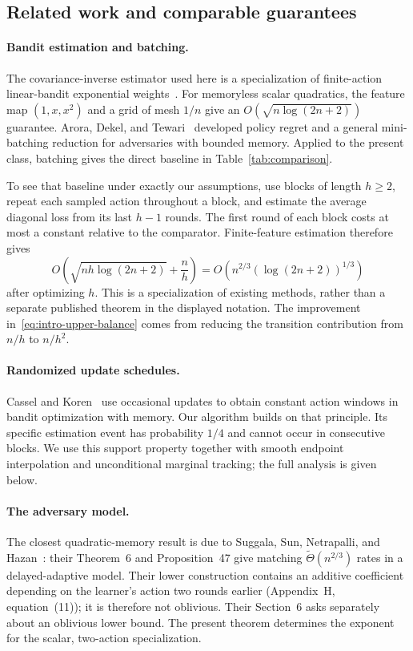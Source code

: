 \documentclass[11pt]{article}
\theoremstyle{definition}
\begin{document}
\subsection{Related work and comparable guarantees}\label{sec:related}

\paragraph{Bandit estimation and batching.}
The covariance-inverse estimator used here is a specialization of finite-action linear-bandit exponential weights~\cite{bubeck}. For memoryless scalar quadratics, the feature map $(1,x,x^2)$ and a grid of mesh $1/n$ give an $O(\sqrt{n\log(2n+2)})$ guarantee. Arora, Dekel, and Tewari~\cite{arora} developed policy regret and a general mini-batching reduction for adversaries with bounded memory. Applied to the present class, batching gives the direct baseline in Table~\ref{tab:comparison}.

To see that baseline under exactly our assumptions, use blocks of length $h\geq2$, repeat each sampled action throughout a block, and estimate the average diagonal loss from its last $h-1$ rounds. The first round of each block costs at most a constant relative to the comparator. Finite-feature estimation therefore gives
\begin{equation}\label{eq:batching-baseline}
 O\!\left(\sqrt{nh\log(2n+2)}+\frac{n}{h}\right)
 =O\!\left(n^{2/3}(\log(2n+2))^{1/3}\right)
\end{equation}
after optimizing $h$. This is a specialization of existing methods, rather than a separate published theorem in the displayed notation. The improvement in~\eqref{eq:intro-upper-balance} comes from reducing the transition contribution from $n/h$ to $n/h^2$.

\paragraph{Randomized update schedules.}
Cassel and Koren~\cite{cassel} use occasional updates to obtain constant action windows in bandit optimization with memory. Our algorithm builds on that principle. Its specific estimation event has probability $1/4$ and cannot occur in consecutive blocks. We use this support property together with smooth endpoint interpolation and unconditional marginal tracking; the full analysis is given below.

\paragraph{The adversary model.}
The closest quadratic-memory result is due to Suggala, Sun, Netrapalli, and Hazan~\cite{suggala}: their Theorem~6 and Proposition~47 give matching $\widetilde\Theta(n^{2/3})$ rates in a delayed-adaptive model. Their lower construction contains an additive coefficient depending on the learner's action two rounds earlier (Appendix~H, equation~(11)); it is therefore not oblivious. Their Section~6 asks separately about an oblivious lower bound. The present theorem determines the exponent for the scalar, two-action specialization.
\end{document}
